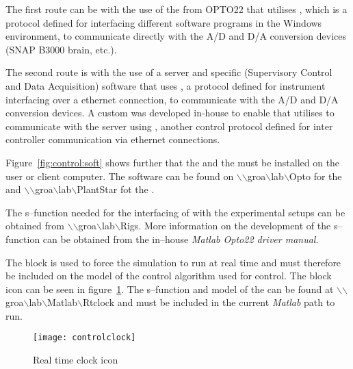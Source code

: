 The first route can be with the use of the  from OPTO22 that utilises , which is a protocol defined for interfacing different software programs in the Windows environment, to communicate directly with the A/D and D/A conversion devices (SNAP B3000 brain, etc.).

The second route is with the use of a server and specific  (Supervisory Control and Data Acquisition) software that uses , a protocol defined for instrument interfacing over a ethernet connection, to communicate with the A/D and D/A conversion devices. A custom  was developed in-house to enable  that utilises  to communicate with the server using , another control protocol defined for inter controller communication via ethernet connections.

Figure~\ref{fig:control:soft} shows further that the  and the  must be installed on the user or client computer. The software can be found on $\backslash$$\backslash$groa$\backslash$lab$\backslash$Opto for the  and $\backslash$$\backslash$groa$\backslash$lab$\backslash$PlantStar fot the .

The s--function needed for the interfacing of  with the experimental setups can be obtained from $\backslash$$\backslash$groa$\backslash$lab$\backslash$Rigs. More information on the development of the s--function can be obtained from the in--house \emph{Matlab Opto22 driver manual}.

The  block is used to force the  simulation to run at real time and must therefore be included on the model of the control algorithm used for control. The block icon can be seen in figure~\ref{fig:control:clock}. The s--function and model of the  can be found at $\backslash$$\backslash$groa$\backslash$lab$\backslash$Matlab$\backslash$Rtclock and must be included in the current \emph{Matlab} path to run.
\begin{figure}[htbp]
	\centering
	\texttt{[image: controlclock]}
	\caption{Real time clock icon}
	\label{fig:control:clock}
\end{figure} 

